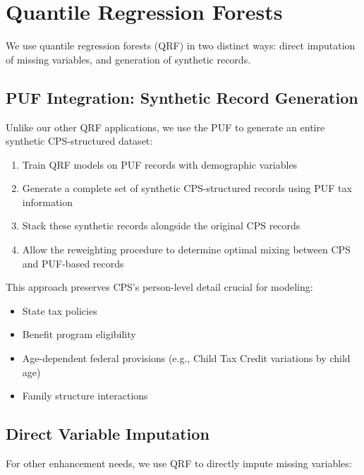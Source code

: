\section{Quantile Regression Forests}

We use quantile regression forests (QRF) in two distinct ways: direct imputation of missing variables, and generation of synthetic records.

\subsection{PUF Integration: Synthetic Record Generation}

Unlike our other QRF applications, we use the PUF to generate an entire synthetic CPS-structured dataset:

\begin{enumerate}
    \item Train QRF models on PUF records with demographic variables
    \item Generate a complete set of synthetic CPS-structured records using PUF tax information
    \item Stack these synthetic records alongside the original CPS records
    \item Allow the reweighting procedure to determine optimal mixing between CPS and PUF-based records
\end{enumerate}

This approach preserves CPS's person-level detail crucial for modeling:
\begin{itemize}
    \item State tax policies
    \item Benefit program eligibility
    \item Age-dependent federal provisions (e.g., Child Tax Credit variations by child age)
    \item Family structure interactions
\end{itemize}

\subsection{Direct Variable Imputation}

For other enhancement needs, we use QRF to directly impute missing variables:

